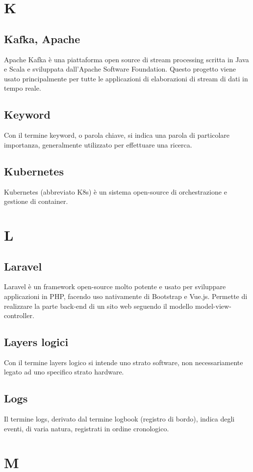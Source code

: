 \newpage \section{K}
\subsection{Kafka, Apache}  Apache Kafka è una piattaforma open source di stream processing scritta in Java e Scala e sviluppata dall'Apache Software Foundation.  Questo progetto viene usato principalmente per tutte le applicazioni di elaborazioni di stream di dati in tempo reale.
\subsection{Keyword}  Con il termine keyword, o parola chiave, si indica una parola di particolare importanza, generalmente utilizzato per effettuare una ricerca.
\subsection{Kubernetes}  Kubernetes (abbreviato K8s) è un sistema open-source di orchestrazione e gestione di container.

\newpage \section{L}
\subsection{Laravel}  Laravel è un framework open-source molto potente e usato per sviluppare applicazioni in PHP, facendo uso nativamente di Bootstrap e Vue.js. Permette di realizzare la parte back-end di un sito web seguendo il modello model-view-controller. 
\subsection{Layers logici}  Con il termine layers logico si intende uno strato software, non necessariamente legato ad uno specifico strato hardware.
\subsection{Logs}  Il termine logs, derivato dal termine logbook (registro di bordo), indica degli eventi, di varia natura, registrati in ordine cronologico.


\newpage \section{M}
